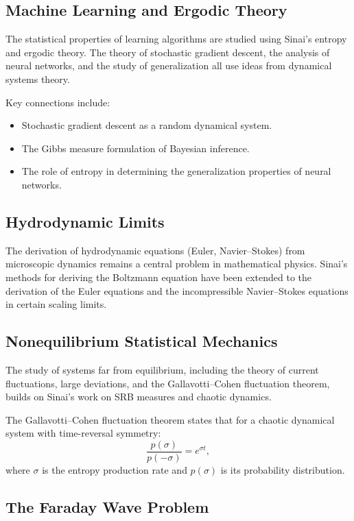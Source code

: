 \subsection{Machine Learning and Ergodic Theory}

The statistical properties of learning algorithms are studied using Sinai's entropy and ergodic theory. The theory of stochastic gradient descent, the analysis of neural networks, and the study of generalization all use ideas from dynamical systems theory.

Key connections include:
\begin{itemize}
\item Stochastic gradient descent as a random dynamical system.
\item The Gibbs measure formulation of Bayesian inference.
\item The role of entropy in determining the generalization properties of neural networks.
\end{itemize}

\subsection{Hydrodynamic Limits}

The derivation of hydrodynamic equations (Euler, Navier--Stokes) from microscopic dynamics remains a central problem in mathematical physics. Sinai's methods for deriving the Boltzmann equation have been extended to the derivation of the Euler equations and the incompressible Navier--Stokes equations in certain scaling limits.

\subsection{Nonequilibrium Statistical Mechanics}

The study of systems far from equilibrium, including the theory of current fluctuations, large deviations, and the Gallavotti--Cohen fluctuation theorem, builds on Sinai's work on SRB measures and chaotic dynamics.

The Gallavotti--Cohen fluctuation theorem states that for a chaotic dynamical system with time-reversal symmetry:
\[
\frac{p(\sigma)}{p(-\sigma)} = e^{\sigma t},
\]
where $\sigma$ is the entropy production rate and $p(\sigma)$ is its probability distribution.

\subsection{The Faraday Wave Problem}

